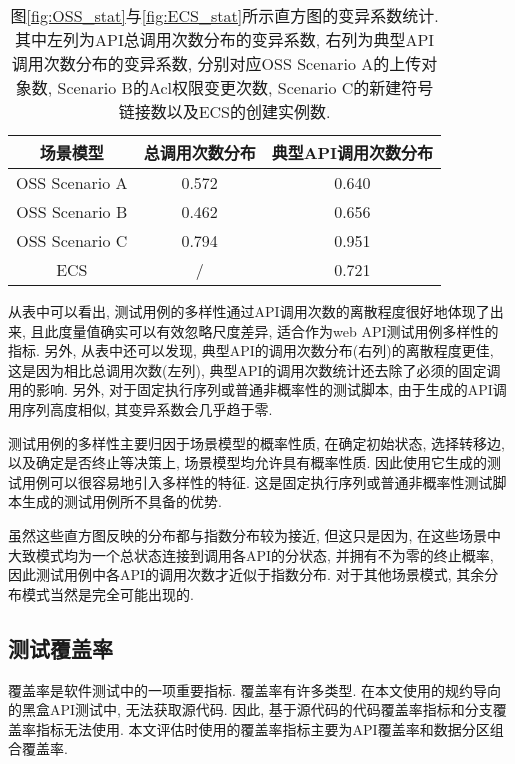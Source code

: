             \begin{table}[!htb]
                \centering
                \begin{tabular}{ccc}
                    \toprule
                    场景模型 & 总调用次数分布 & 典型API调用次数分布  \\
                    \midrule
                    OSS Scenario A & 0.572 & 0.640 \\
                    OSS Scenario B & 0.462 & 0.656 \\
                    OSS Scenario C & 0.794 & 0.951 \\
                    \hline
                    ECS & / & 0.721 \\
                    \bottomrule
                \end{tabular}
                \caption{图\ref{fig:OSS_stat}与\ref{fig:ECS_stat}所示直方图的变异系数统计. 其中左列为API总调用次数分布的变异系数, 右列为典型API调用次数分布的变异系数, 分别对应OSS Scenario A的上传对象数, Scenario B的Acl权限变更次数, Scenario C的新建符号链接数以及ECS的创建实例数.}
                \label{tab:cv_stat}
            \end{table}
            
            从表中可以看出, 测试用例的多样性通过API调用次数的离散程度很好地体现了出来, 且此度量值确实可以有效忽略尺度差异, 适合作为web API测试用例多样性的指标. 另外, 从表中还可以发现, 典型API的调用次数分布(右列)的离散程度更佳, 这是因为相比总调用次数(左列), 典型API的调用次数统计还去除了必须的固定调用的影响. 另外, 对于固定执行序列或普通非概率性的测试脚本, 由于生成的API调用序列高度相似, 其变异系数会几乎趋于零.
            
            测试用例的多样性主要归因于场景模型的概率性质, 在确定初始状态, 选择转移边, 以及确定是否终止等决策上, 场景模型均允许具有概率性质. 因此使用它生成的测试用例可以很容易地引入多样性的特征. 这是固定执行序列或普通非概率性测试脚本生成的测试用例所不具备的优势.
            
            虽然这些直方图反映的分布都与指数分布较为接近, 但这只是因为, 在这些场景中大致模式均为一个总状态连接到调用各API的分状态, 并拥有不为零的终止概率, 因此测试用例中各API的调用次数才近似于指数分布. 对于其他场景模式, 其余分布模式当然是完全可能出现的.

        \subsection{测试覆盖率}
            覆盖率是软件测试中的一项重要指标. 覆盖率有许多类型. 在本文使用的规约导向的黑盒API测试中, 无法获取源代码. 因此, 基于源代码的代码覆盖率指标和分支覆盖率指标无法使用. 本文评估时使用的覆盖率指标主要为API覆盖率和数据分区组合覆盖率.
            
